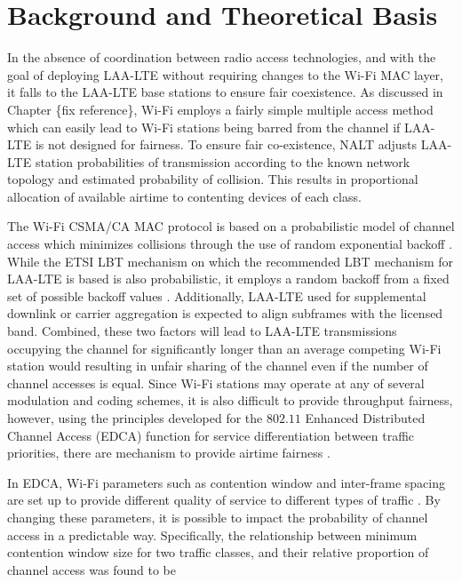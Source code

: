 \section{Background and Theoretical Basis}
\label{background}
In the absence of coordination between radio access technologies, and with the goal of deploying \mbox{LAA-LTE} without requiring changes to the \mbox{Wi-Fi} MAC layer, it falls to the \mbox{LAA-LTE} base stations to ensure fair coexistence. As discussed in Chapter \{fix reference\}, \mbox{Wi-Fi} employs a fairly simple multiple access method which can easily lead to \mbox{Wi-Fi} stations being barred from the channel if \mbox{LAA-LTE} is not designed for fairness. To ensure fair co-existence, NALT adjusts \mbox{LAA-LTE} station probabilities of transmission according to the known network topology and estimated probability of collision.  This results in proportional allocation of available airtime to contenting devices of each class.

The \mbox{Wi-Fi} CSMA/CA MAC protocol is based on a probabilistic model of channel access which minimizes collisions through the use of random exponential backoff \cite{80211}.  While the ETSI LBT mechanism on which the recommended LBT mechanism for \mbox{LAA-LTE} is based is also probabilistic, it employs a random backoff from a fixed set of possible backoff values \cite{3gpp}.  Additionally, \mbox{LAA-LTE} used for supplemental downlink or carrier aggregation is expected to align subframes with the licensed band.  Combined, these two factors will lead to \mbox{LAA-LTE} transmissions occupying the channel for significantly longer than an average competing \mbox{Wi-Fi} station would resulting in unfair sharing of the channel even if the number of channel accesses is equal.  Since \mbox{Wi-Fi} stations may operate at any of several modulation and coding schemes, it is also difficult to provide throughput fairness, however, using the principles developed for the $802.11$ Enhanced Distributed Channel Access (EDCA) function for service differentiation between traffic priorities, there are mechanism to provide airtime fairness \cite{80211}.  

In EDCA, \mbox{Wi-Fi} parameters such as contention window and inter-frame spacing are set up to provide different quality of service to different types of traffic \cite{80211}.  By changing these parameters, it is possible to impact the probability of channel access in a predictable way.  Specifically, the relationship between minimum contention window size for two traffic classes, and their relative proportion of channel access was found to be 


